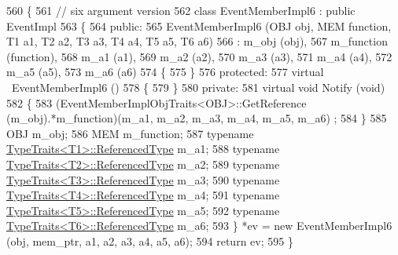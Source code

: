\begin{DoxyCode}
560 \{
561   \textcolor{comment}{// six argument version}
562   \textcolor{keyword}{class }EventMemberImpl6 : \textcolor{keyword}{public} EventImpl
563   \{
564 \textcolor{keyword}{public}:
565     EventMemberImpl6 (OBJ obj, MEM \textcolor{keyword}{function}, T1 a1, T2 a2, T3 a3, T4 a4, T5 a5, T6 a6)
566       : m\_obj (obj),
567         m\_function (function),
568         m\_a1 (a1),
569         m\_a2 (a2),
570         m\_a3 (a3),
571         m\_a4 (a4),
572         m\_a5 (a5),
573         m\_a6 (a6)
574     \{
575     \}
576 \textcolor{keyword}{protected}:
577     \textcolor{keyword}{virtual} ~EventMemberImpl6 ()
578     \{
579     \}
580 \textcolor{keyword}{private}:
581     \textcolor{keyword}{virtual} \textcolor{keywordtype}{void} Notify (\textcolor{keywordtype}{void})
582     \{
583       (EventMemberImplObjTraits<OBJ>::GetReference (m\_obj).*m\_function)(m\_a1, m\_a2, m\_a3, m\_a4, m\_a5, m\_a6)
      ;
584     \}
585     OBJ m\_obj;
586     MEM m\_function;
587     \textcolor{keyword}{typename} \hyperlink{structTypeTraits}{TypeTraits<T1>::ReferencedType} m\_a1;
588     \textcolor{keyword}{typename} \hyperlink{structTypeTraits}{TypeTraits<T2>::ReferencedType} m\_a2;
589     \textcolor{keyword}{typename} \hyperlink{structTypeTraits}{TypeTraits<T3>::ReferencedType} m\_a3;
590     \textcolor{keyword}{typename} \hyperlink{structTypeTraits}{TypeTraits<T4>::ReferencedType} m\_a4;
591     \textcolor{keyword}{typename} \hyperlink{structTypeTraits}{TypeTraits<T5>::ReferencedType} m\_a5;
592     \textcolor{keyword}{typename} \hyperlink{structTypeTraits_aad10ee3d301aeae33030c336748843b5}{TypeTraits<T6>::ReferencedType} m\_a6;
593   \} *ev = \textcolor{keyword}{new} EventMemberImpl6 (obj, mem\_ptr, a1, a2, a3, a4, a5, a6);
594   \textcolor{keywordflow}{return} ev;
595 \}
\end{DoxyCode}
